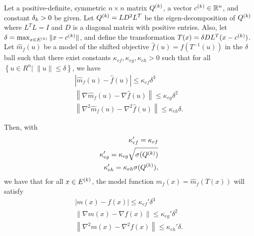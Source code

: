 
\begin{theorem}
\label{shifted_ellipsoid}
Let a positive-definite, symmetric $n\times n$ matrix ${Q^{(k)}}$, a vector ${c^{(k)}} \in \mathbb R^n$, and constant ${\delta_k} > 0$ be given.
Let ${Q^{(k)}} = L D^2 L^T$ be the eigen-decomposition of ${Q^{(k)}}$ where $L^TL = I$ and $D$ is a diagonal matrix with positive entries.
Also, let $\delta = \max_{x\in {E^{(k)}}}\|x-{c^{(k)}}\|$, 
and define the transformation $T(x) = \delta DL^T(x - {c^{(k)}})$.
Let $\hat m_f(u)$ be a model of the shifted objective $\hat f(u) = f(T^{-1}(u))$ in the $\delta$ ball such that
there exist constants $\kappa_{ef}, \kappa_{eg}, \kappa_{eh} > 0$ such that for all $\left\{u \in R^n | \;\|u\| \le \delta \right\}$, we have
\begin{align*}
\left|\hat m_f(u) - \hat f(u)\right| \le \kappa_{ef} \delta^3\\
\left\|\nabla \hat m_f(u) - \nabla \hat f(u)\right\| \le \kappa_{eg}\delta^2\\
\left\|\nabla^2 \hat m_f(u) - \nabla^2 \hat f(u)\right\| \le \kappa_{eh}\delta.
\end{align*}

Then, with
\begin{align*}
\kappa_{ef}' = \kappa_{ef} \\
\kappa_{eg}' = \kappa_{eg}\sqrt{{\sigma}({Q^{(k)}})} \\
\kappa_{eh}' = \kappa_{eh}{\sigma}({Q^{(k)}}),
\end{align*}
we have that for all $x \in {E^{(k)}}$,
the model function $m_f(x) = \hat m_f(T(x))$ will satisfy
\begin{align*}
\left| m(x) - f(x)\right| \le \kappa_{ef}'\delta^3 \\
\left\|\nabla  m(x) - \nabla  f(x)\right\| \le \kappa_{eg}'\delta^2 \\
\left\|\nabla^2 m(x) - \nabla^2 f(x)\right\| \le \kappa_{eh}'\delta.
\end{align*}
\end{theorem}

